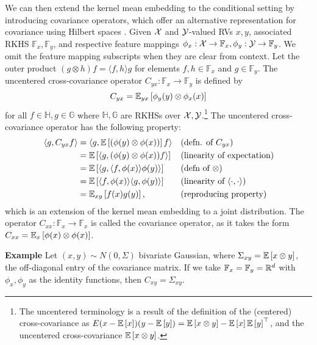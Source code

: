 \documentclass{article}
\begin{document}
We can then extend the kernel mean embedding to the conditional setting
by introducing covariance operators, which offer an alternative
representation for covariance using Hilbert spaces \citep{baker1970,baker1973}.
Given $\mathcal{X}$ and $\mathcal{Y}$-valued RVs $x,y$, associated
RKHS $\mathbb{F}_x,\mathbb{F}_y$, and respective feature mappings
$\phi_x:\mathcal{X}\to\mathbb{F}_x,\phi_y:\mathcal{Y}\to\mathbb{F}_y$.
We omit the feature mapping subscripts when they are clear from context.
Let the outer product $(g \otimes h)f = \langle f,h\rangle g$ for elements
$f,h\in\mathbb{F}_x$ and $g\in\mathbb{F}_y$.
The uncentered cross-covariance operator $C_{yx}: \mathbb{F}_x\to\mathbb{F}_y$ is defined by
\begin{equation}
    \label{eqn:xcov}
    C_{yx} = \mathbb{E}_{yx}\left[\phi_y(y)\otimes\phi_x(x)\right]
\end{equation}
for all $f\in\mathbb{H},g\in\mathbb{G}$ where $\mathbb{H},\mathbb{G}$ are
RKHSs over $\mathcal{X},\mathcal{Y}$.\footnote{
The uncentered terminology is a result of the definition of the (centered) cross-covariance
as $E{(x - \mathbb{E}\left[x\right])(y - \mathbb{E}\left[y\right])} = \mathbb{E}\left[x\otimes y\right] - \mathbb{E}\left[x\right]\mathbb{E}\left[y\right]^\top$,
and the uncentered cross-covariance $\mathbb{E}\left[x\otimes y\right]$.
}
The uncentered cross-covariance operator has the following property:
\begin{equation}
    \label{eqn:xcove}
    \begin{aligned}
    \langle g, C_{yx}f\rangle
    &= \langle g, \mathbb{E}\left[(\phi(y)\otimes\phi(x))\right]f\rangle && \text{(defn. of }C_{yx})\\
    &= \mathbb{E}\left[\langle g, (\phi(y)\otimes\phi(x))f\rangle\right] && \text{(linearity of expectation)}\\
    &= \mathbb{E}\left[\langle g, \langle f, \phi(x)\rangle \phi(y)\rangle\right] && \text{(defn of }\otimes)\\
    &= \mathbb{E}\left[\langle f, \phi(x)\rangle\langle g, \phi(y)\rangle\right] && \text{(linearity of }\langle\cdot,\cdot\rangle)\\
    &= \mathbb{E}_{xy}\left[f(x)g(y)\right], && \text{(reproducing property)}
    \end{aligned}
\end{equation}
which is an extension of the kernel mean embedding to a joint distribution.
The operator $C_{xx}:\mathbb{F}_x\to\mathbb{F}_x$ is called the covariance operator,
as it takes the form $C_{xx} = \mathbb{E}_{x}\left[\phi(x)\otimes\phi(x)\right]$.

\textbf{Example}
Let $(x,y)\sim N(0,\Sigma)$ bivariate Gaussian,
where $\Sigma_{xy} = \mathbb{E}\left[x \otimes y\right]$, the off-diagonal
entry of the covariance matrix.
If we take $\mathbb{F}_x=\mathbb{F}_y=\mathbb{R}^d$
with $\phi_x,\phi_y$ as the identity functions,
then $C_{xy} = \Sigma_{xy}$.
\end{document}
